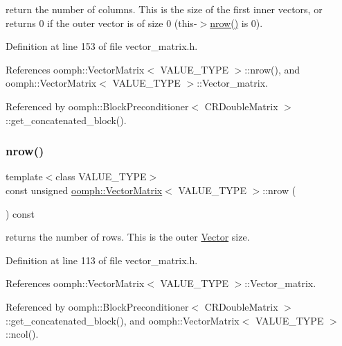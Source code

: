 return the number of columns. This is the size of the first inner vectors, or returns 0 if the outer vector is of size 0 (this-\/$>$\hyperlink{classoomph_1_1VectorMatrix_a9beb051515fea3a264843aae9783e386}{nrow()} is 0). 



Definition at line 153 of file vector\+\_\+matrix.\+h.



References oomph\+::\+Vector\+Matrix$<$ V\+A\+L\+U\+E\+\_\+\+T\+Y\+P\+E $>$\+::nrow(), and oomph\+::\+Vector\+Matrix$<$ V\+A\+L\+U\+E\+\_\+\+T\+Y\+P\+E $>$\+::\+Vector\+\_\+matrix.



Referenced by oomph\+::\+Block\+Preconditioner$<$ C\+R\+Double\+Matrix $>$\+::get\+\_\+concatenated\+\_\+block().

\mbox{\label{classoomph_1_1VectorMatrix_a9beb051515fea3a264843aae9783e386}} 
\subsubsection{\texorpdfstring{nrow()}{nrow()}}
{\footnotesize\ttfamily template$<$class V\+A\+L\+U\+E\+\_\+\+T\+Y\+PE$>$ \\
const unsigned \hyperlink{classoomph_1_1VectorMatrix}{oomph\+::\+Vector\+Matrix}$<$ V\+A\+L\+U\+E\+\_\+\+T\+Y\+PE $>$\+::nrow (\begin{DoxyParamCaption}{ }\end{DoxyParamCaption}) const\hspace{0.3cm}{\ttfamily [inline]}}



returns the number of rows. This is the outer \hyperlink{classoomph_1_1Vector}{Vector} size. 



Definition at line 113 of file vector\+\_\+matrix.\+h.



References oomph\+::\+Vector\+Matrix$<$ V\+A\+L\+U\+E\+\_\+\+T\+Y\+P\+E $>$\+::\+Vector\+\_\+matrix.



Referenced by oomph\+::\+Block\+Preconditioner$<$ C\+R\+Double\+Matrix $>$\+::get\+\_\+concatenated\+\_\+block(), and oomph\+::\+Vector\+Matrix$<$ V\+A\+L\+U\+E\+\_\+\+T\+Y\+P\+E $>$\+::ncol().

